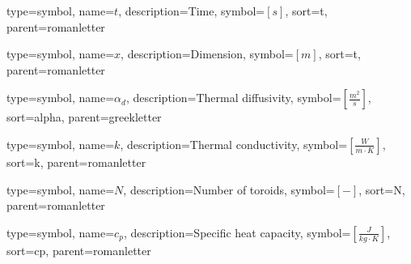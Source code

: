 {
	type=symbol, %
	name={\ensuremath{t}}, %
	description={Time}, %
	symbol={$\left[s\right]$}, %
	sort=t, %
	parent=romanletter %
}

{
	type=symbol, %
	name={\ensuremath{x}}, %
	description={Dimension}, %
	symbol={$\left[m\right]$}, %
	sort=t, %
	parent=romanletter %
}

{
	type=symbol, %
	name={\ensuremath{\alpha_d}}, %
	description={Thermal diffusivity}, %
	symbol={$\left[\frac{m^2}{s}\right]$}, %
	sort=alpha, %
	parent=greekletter %
}

{
	type=symbol, %
	name={\ensuremath{k}}, %
	description={Thermal conductivity}, %
	symbol={$\left[\frac{W}{m\cdot K}\right]$}, %
	sort=k, %
	parent=romanletter %
}

{
	type=symbol, %
	name={\ensuremath{N}}, %
	description={Number of toroids}, %
	symbol={$\left[-\right]$}, %
	sort=N, %
	parent=romanletter %
}

{
	type=symbol, %
	name={\ensuremath{c_p}}, %
	description={Specific heat capacity}, %
	symbol={$\left[\frac{J}{kg\cdot K}\right]$}, %
	sort=cp, %
	parent=romanletter %
}

